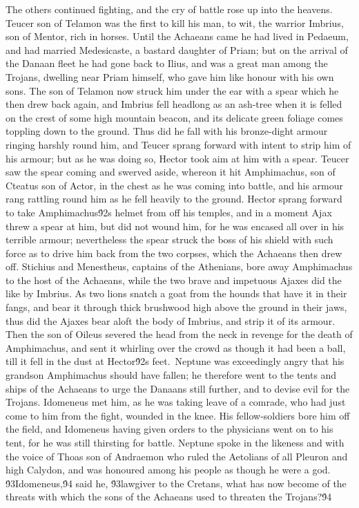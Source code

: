 {The others continued fighting, and the cry of battle rose up into the heavens. Teucer son of Telamon was the first to kill his man, to wit, the warrior Imbrius, son of Mentor, rich in horses. Until the Achaeans came he had lived in Pedaeum, and had married Medesicaste, a bastard daughter of Priam; but on the arrival of the Danaan fleet he had gone back to Ilius, and was a great man among the Trojans, dwelling near Priam himself, who gave him like honour with his own sons. The son of Telamon now struck him under the ear with a spear which he then drew back again, and Imbrius fell headlong as an ash-tree when it is felled on the crest of some high mountain beacon, and its delicate green foliage comes toppling down to the ground. Thus did he fall with his bronze-dight armour ringing harshly round him, and Teucer sprang forward with intent to strip him of his armour; but as he was doing so, Hector took aim at him with a spear. Teucer saw the spear coming and swerved aside, whereon it hit Amphimachus, son of Cteatus son of Actor, in the chest as he was coming into battle, and his armour rang rattling round him as he fell heavily to the ground. Hector sprang forward to take Amphimachus\'92s helmet from off his temples, and in a moment Ajax threw a spear at him, but did not wound him, for he was encased all over in his terrible armour; nevertheless the spear struck the boss of his shield with such force as to drive him back from the two corpses, which the Achaeans then drew off. Stichius and Menestheus, captains of the Athenians, bore away Amphimachus to the host of the Achaeans, while the two brave and impetuous Ajaxes did the like by Imbrius. As two lions snatch a goat from the hounds that have it in their fangs, and bear it through thick brushwood high above the ground in their jaws, thus did the Ajaxes bear aloft the body of Imbrius, and strip it of its armour. Then the son of Oileus severed the head from the neck in revenge for the death of Amphimachus, and sent it whirling over the crowd as though it had been a ball, till it fell in the dust at Hector\'92s feet.\
Neptune was exceedingly angry that his grandson Amphimachus should have fallen; he therefore went to the tents and ships of the Achaeans to urge the Danaans still further, and to devise evil for the Trojans. Idomeneus met him, as he was taking leave of a comrade, who had just come to him from the fight, wounded in the knee. His fellow-soldiers bore him off the field, and Idomeneus having given orders to the physicians went on to his tent, for he was still thirsting for battle. Neptune spoke in the likeness and with the voice of Thoas son of Andraemon who ruled the Aetolians of all Pleuron and high Calydon, and was honoured among his people as though he were a god. \'93Idomeneus,\'94 said he, \'93lawgiver to the Cretans, what has now become of the threats with which the sons of the Achaeans used to threaten the Trojans?\'94\
}
